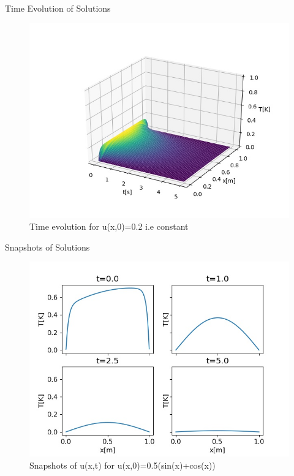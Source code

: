 \documentclass[10pt,compress]{beamer}
\begin{document}
\begin{frame}{Time Evolution of Solutions}
\begin{figure}
\begin{center}
	\includegraphics[scale=0.5]{../plots/evol1_0500_2000.jpg}
	\caption{Time evolution for u(x,0)=0.2 i.e constant}
	\label{fig:const-evol}
\end{center}
\end{figure}
\end{frame}

\begin{frame}{Snapshots of Solutions}
\begin{figure}
\begin{center}
	\includegraphics[scale=0.5]{../plots/snap_2_0500_2000.jpg}
	\caption{Snapshots of u(x,t) for  u(x,0)=0.5(sin(x)+cos(x))}
	\label{fig:sin-cos-snap}
\end{center}
\end{figure}
\end{frame}
\end{document}
